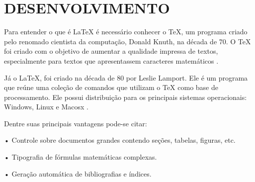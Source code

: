\section{DESENVOLVIMENTO}
Para entender o que é LaTeX é necessário conhecer o TeX, um programa criado pelo renomado cientista da computação, Donald Knuth, na década de 70. O TeX foi criado com o objetivo de aumentar a qualidade impressa de textos, especialmente para textos que apresentassem caracteres matemáticos \cite{oetiker2001}.

Já o LaTeX, foi criado na década de 80 por Leslie Lamport. Ele é um programa que reúne uma coleção de comandos que utilizam o TeX como base de processamento. Ele possui distribuição para os principais sistemas operacionais: Windows, Linux e Macosx \cite{oetiker2001}.

Dentre suas principais vantagens pode-se citar:

•	Controle sobre documentos grandes contendo seções, tabelas, figuras, etc.

•	Tipografia de fórmulas matemáticas complexas.

•	Geração automática de bibliografias e índices.\\